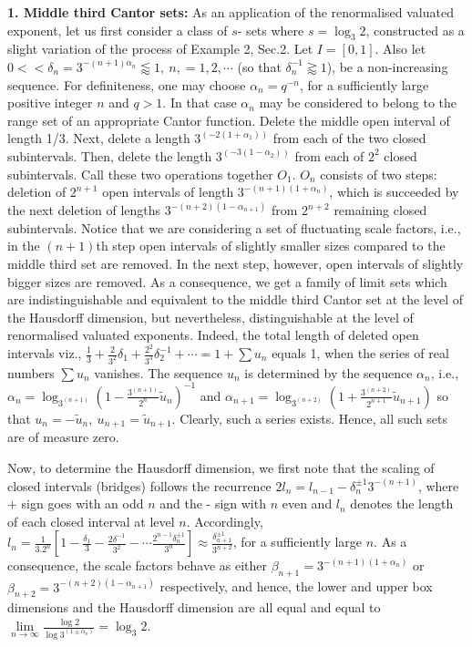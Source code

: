 \documentclass[12pt]{article}
\begin{document}
{\bf 1. Middle third Cantor sets:} As an application of the renormalised valuated exponent, let us first consider 
a class of $s$- sets where $s=\log_3 2$, constructed as a slight variation of the process of Example 2, Sec.2. Let $I=[0,1]$. Also let $0<<\delta_n=3^{-(n+1)\alpha_n}
\lessapprox 1,  \ n,=1,2,\cdots$ (so that $\delta_n^{-1}\gtrapprox 1$), be a non-increasing sequence. For definiteness, one may choose $\alpha_n= q^{-n}$, for a sufficiently large positive integer $n$ and $q>1$. In that case $\alpha_n$ may be considered to belong to the range set of an appropriate Cantor function. Delete the middle open interval of length 1/3. Next, delete a length $3^{(-2(1+\alpha_1))}$ from each of the two closed subintervals. Then, delete the length  $3^{(-3(1-\alpha_2))}$ from each of $2^2$ closed subintervals. Call these two operations together $O_1$. $O_n$ consists of two steps: deletion of $2^{n+1}$ open intervals of length $3^{-(n+1)(1+\alpha_{n})}$, which is succeeded by the next deletion of lengths  $3^{-(n+2)(1-\alpha_{n+1})}$ from  $2^{n+2}$ remaining closed subintervals. Notice that we are considering a set of fluctuating scale factors, i.e., in the $(n+1)$th step open intervals of slightly smaller sizes compared to the middle third set are removed. In the next step, however, open intervals of slightly bigger sizes are removed. As a consequence,  we get a family of limit sets which are indistinguishable and equivalent to the middle third Cantor set at the level of the Hausdorff  dimension, but nevertheless, distinguishable at the level of renormalised valuated exponents. Indeed, the total length of deleted open intervals viz.,  ${\frac{1}{3}}+{\frac{2}{3^2}}\delta_1+ {\frac{2^2}{3^3}}\delta^{-1}_2 +\cdots= 1+\sum u_n$ equals 1, when the series of real numbers $\sum u_n$ vanishes. The sequence $u_n$ is determined by the sequence $\alpha_n$, i.e., $\alpha_n=\log_{3^{(n+1)}} (1-{\frac{3^{(n+1)}}{2^n}} \tilde u_n)^{-1}$ and $\alpha_{n+1} =\log_{3^{(n+2)}} (1+{\frac{3^{(n+2)}}{2^{n+1}}} \tilde u_{n+1})$ so that $u_n=-\tilde u_n, \ u_{n+1}=\tilde u_{n+1}$. Clearly, such a series exists. Hence, all such sets are of measure zero.

\vspace{.25cm}

Now, to determine the Hausdorff dimension, we first note that the scaling of closed intervals (bridges) follows the recurrence $2l_n=l_{n-1}-\delta_n^{\pm 1}3^{-(n+1)}$, where $+$ sign goes with an odd $n$ and the - sign with  $n$ even and $l_n$ denotes the length of each closed interval at level $n$. Accordingly, $l_n={\frac{1}{3.2^n}} [1- {\frac{\delta_1}{3}} - {\frac{2\delta^{-1}}{3^2}} - \cdots {\frac{2^{n-1}\delta_n^{\pm 1}}{3^n}}] \approx {\frac{\delta_{n+1}^{\pm 1}}{3^{n+2}}}$, for a sufficiently large $n$. As a consequence, the scale factors behave as either $\beta_{n+1}=3^{-(n+1)(1+\alpha_{n})}$  or $\beta_{n+2}=3^{-(n+2)(1-\alpha_{n+1})}$ respectively, and hence, the lower and upper box dimensions and the Hausdorff dimension are all equal and equal to  $\underset{n\rightarrow \infty }{\lim } {\frac{\log 2}{ \log 3^{(1 \pm\alpha_{n})}}}=\log_3 2$.
\end{document}

